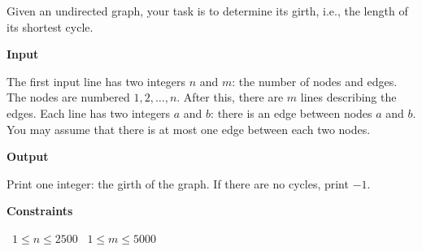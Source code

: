 Given an undirected graph, your task is to determine its girth, i.e., the length of its shortest cycle.

\vspace{0.3cm}\noindent\textbf{Input}

The first input line has two integers $n$ and $m$: the number of nodes and edges. The nodes are numbered $1,2,\dots,n$.
After this, there are $m$ lines describing the edges. Each line has two integers $a$ and $b$: there is an edge between nodes $a$ and $b$.
You may assume that there is at most one edge between each two nodes.

\vspace{0.3cm}\noindent\textbf{Output}

Print one integer: the girth of the graph. If there are no cycles, print $-1$.

\vspace{0.3cm}\noindent\textbf{Constraints}

\textbullet\ $1 \le n \le 2500$
\textbullet\ $1 \le m \le 5000$